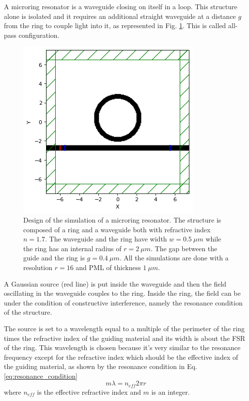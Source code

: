 A microring resonator is a waveguide closing on itself in a loop. This structure alone is isolated and it requires an additional straight waveguide at a distance \(g\) from the ring to couple light into it, as represented in Fig. \ref{fig:ring_design}. This is called all-pass configuration.

\begin{figure}[H]
    \centering
    \includegraphics[width=0.6\linewidth]{Figures/ring_design.png}
    \caption{Design of the simulation of a microring resonator. The structure is composed of a ring and a waveguide both with refractive index \(n=1.7\). The waveguide and the ring have width \(w=0.5\ \mu m\) while the ring has an internal radius of \(r=2\ \mu m\). The gap between the guide and the ring is \(g=0.4\ \mu m\). All the simulations are done with a resolution \(r=16\) and PML of thickness \(1\ \mu m\).}
    \label{fig:ring_design}
\end{figure}

A Gaussian source (red line) is put inside the waveguide and then the field oscillating in the waveguide couples to the ring. Inside the ring, the field can be under the condition of constructive interference, namely the resonance condition of the structure.

The source is set to a wavelength equal to a multiple of the perimeter of the ring times the refractive index of the guiding material and its width is about the FSR of the ring. This wavelength is chosen because it's very similar to the resonance frequency except for the refractive index which should be the effective index of the guiding material, as shown by the resonance condition in Eq. \ref{eq:resonance_condition}
\begin{equation}
    m\lambda =  n_{eff} 2\pi r
    \label{eq:resonance_condition}
\end{equation}
where \(n_{eff}\) is the effective refractive index and \(m\) is an integer. 

